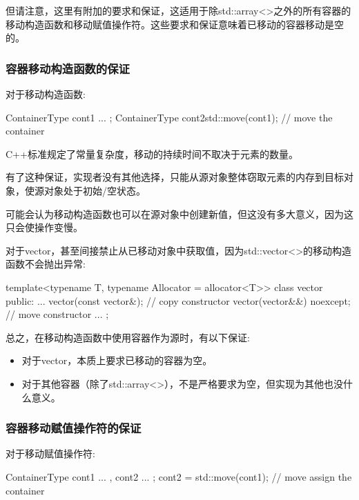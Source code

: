 但请注意，这里有附加的要求和保证，这适用于除std::array<>之外的所有容器的移动构造函数和移动赋值操作符。这些要求和保证意味着已移动的容器移动是空的。

\subsubsection{容器移动构造函数的保证}

对于移动构造函数:

\begin{cppcode}
ContainerType cont1{ ... };
ContainerType cont2{std::move(cont1)}; // move the container
\end{cppcode}

C++标准规定了常量复杂度，移动的持续时间不取决于元素的数量。

有了这种保证，实现者没有其他选择，只能从源对象整体窃取元素的内存到目标对象，使源对象处于初始/空状态。

可能会认为移动构造函数也可以在源对象中创建新值，但这没有多大意义，因为这只会使操作变慢。

对于vector，甚至间接禁止从已移动对象中获取值，因为std::vector<>的移动构造函数不会抛出异常:

\begin{cppcode}
template<typename T, typename Allocator = allocator<T>>
class vector {
	public:
	...
	vector(const vector&); // copy constructor
	vector(vector&&) noexcept; // move constructor
	...
};
\end{cppcode}

总之，在移动构造函数中使用容器作为源时，有以下保证:

\begin{itemize}
	\item 对于vector，本质上要求已移动的容器为空。
	\item 对于其他容器（除了std::array<>），不是严格要求为空，但实现为其他也没什么意义。
\end{itemize}

\subsubsection{容器移动赋值操作符的保证}

对于移动赋值操作符:

\begin{cppcode}
ContainerType cont1{ ... }, cont2{ ... };
cont2 = std::move(cont1); // move assign the container
\end{cppcode}

